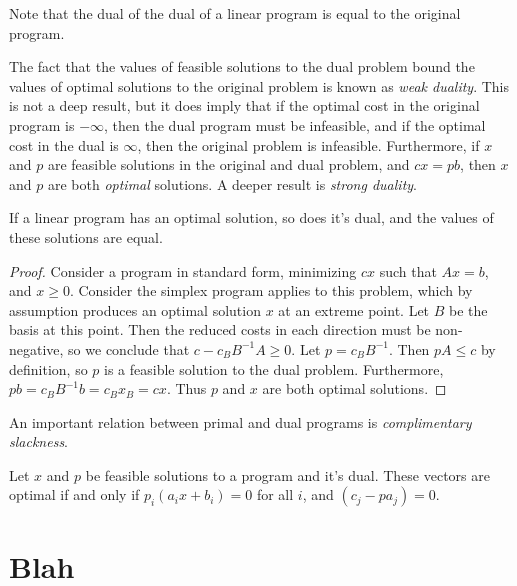 \begin{remark}
    Note that the dual of the dual of a linear program is equal to the original program.
\end{remark}

The fact that the values of feasible solutions to the dual problem bound the values of optimal solutions to the original problem is known as \emph{weak duality}. This is not a deep result, but it does imply that if the optimal cost in the original program is $-\infty$, then the dual program must be infeasible, and if the optimal cost in the dual is $\infty$, then the original problem is infeasible. Furthermore, if $x$ and $p$ are feasible solutions in the original and dual problem, and $cx = pb$, then $x$ and $p$ are both \emph{optimal} solutions. A deeper result is \emph{strong duality}.

\begin{theorem}
    If a linear program has an optimal solution, so does it's dual, and the values of these solutions are equal.
\end{theorem}
\begin{proof}
    Consider a program in standard form, minimizing $cx$ such that $Ax = b$, and $x \geq 0$. Consider the simplex program applies to this problem, which by assumption produces an optimal solution $x$ at an extreme point. Let $B$ be the basis at this point. Then the reduced costs in each direction must be non-negative, so we conclude that $c - c_BB^{-1}A \geq 0$. Let $p = c_BB^{-1}$. Then $pA \leq c$ by definition, so $p$ is a feasible solution to the dual problem. Furthermore, $pb = c_BB^{-1}b = c_Bx_B = cx$. Thus $p$ and $x$ are both optimal solutions.
\end{proof}

An important relation between primal and dual programs is \emph{complimentary slackness}.

\begin{theorem}
    Let $x$ and $p$ be feasible solutions to a program and it's dual. These vectors are optimal if and only if $p_i(a_ix + b_i) = 0$ for all $i$, and $(c_j - pa_j) = 0$.
\end{theorem}





\chapter{Blah}

